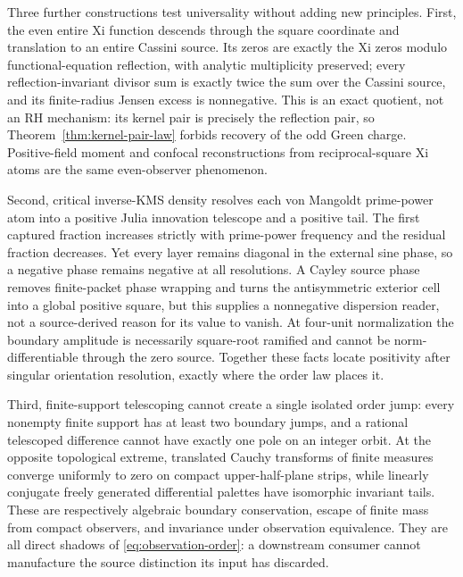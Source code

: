 \documentclass[11pt]{article}
\theoremstyle{definition}
\theoremstyle{remark}
\begin{document}
Three further constructions test universality without adding new principles.
First, the even entire Xi function descends through the square coordinate and
translation to an entire Cassini source.  Its zeros are exactly the Xi zeros
modulo functional-equation reflection, with analytic multiplicity preserved;
every reflection-invariant divisor sum is exactly twice the sum over the
Cassini source, and its finite-radius Jensen excess is nonnegative.  This is
an exact quotient, not an RH mechanism: its kernel pair is precisely the
reflection pair, so Theorem~\ref{thm:kernel-pair-law} forbids recovery of the
odd Green charge.  Positive-field moment and confocal reconstructions from
reciprocal-square Xi atoms are the same even-observer phenomenon.

Second, critical inverse-KMS density resolves each von Mangoldt
prime-power atom into a positive Julia innovation telescope and a positive
tail.  The first captured fraction increases strictly with prime-power
frequency and the residual fraction decreases.  Yet every layer remains
diagonal in the external sine phase, so a negative phase remains negative at
all resolutions.  A Cayley source phase removes finite-packet phase wrapping
and turns the antisymmetric exterior cell into a global positive square, but
this supplies a nonnegative dispersion reader, not a source-derived reason
for its value to vanish.  At four-unit normalization the boundary amplitude
is necessarily square-root ramified and cannot be norm-differentiable through
the zero source.  Together these facts locate positivity after singular
orientation resolution, exactly where the order law places it.

Third, finite-support telescoping cannot create a single isolated order
jump: every nonempty finite support has at least two boundary jumps, and a
rational telescoped difference cannot have exactly one pole on an integer
orbit.  At the opposite topological extreme, translated Cauchy transforms of
finite measures converge uniformly to zero on compact upper-half-plane
strips, while linearly conjugate freely generated differential palettes have
isomorphic invariant tails.  These are respectively algebraic boundary
conservation, escape of finite mass from compact observers, and invariance
under observation equivalence.  They are all direct shadows of
\eqref{eq:observation-order}: a downstream consumer cannot manufacture the
source distinction its input has discarded.
\end{document}

